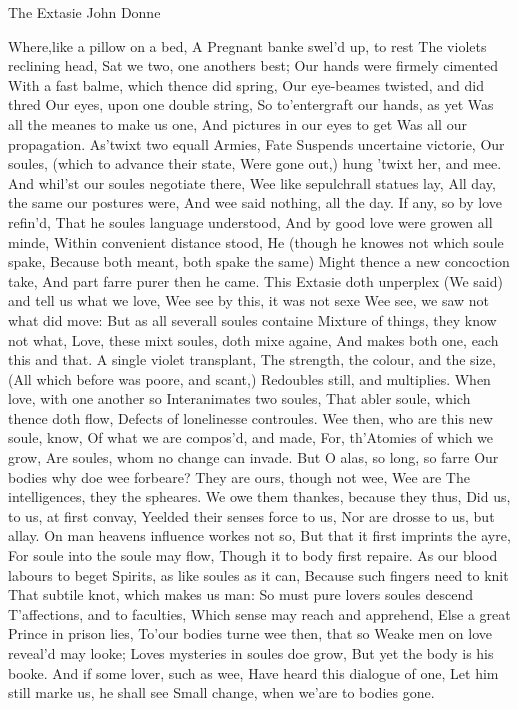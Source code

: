 \begin{poem}
{The Extasie}
{John Donne}
 
Where,like a pillow on a bed, 
   A Pregnant banke swel'd up, to rest 
The violets reclining head, 
   Sat we two, one anothers best; 
Our hands were firmely cimented 
With a fast balme, which thence did spring, 
Our eye-beames twisted, and did thred 
   Our eyes, upon one double string, 
So to'entergraft our hands, as yet 
   Was all the meanes to make us one, 
And pictures in our eyes to get 
   Was all our propagation. 
As'twixt two equall Armies, Fate 
   Suspends uncertaine victorie, 
Our soules, (which to advance their state, 
   Were gone out,) hung 'twixt her, and mee. 
And whil'st our soules negotiate there, 
   Wee like sepulchrall statues lay, 
All day, the same our postures were, 
   And wee said nothing, all the day. 
If any, so by love refin'd, 
   That he soules language understood, 
And by good love were growen all minde, 
   Within convenient distance stood, 
He (though he knowes not which soule spake, 
   Because both meant, both spake the same) 
Might thence a new concoction take, 
   And part farre purer then he came. 
This Extasie doth unperplex 
   (We said) and tell us what we love, 
Wee see by this, it was not sexe 
   Wee see, we saw not what did move: 
But as all severall soules containe 
   Mixture of things, they know not what, 
Love, these mixt soules, doth mixe againe, 
   And makes both one, each this and that. 
A single violet transplant, 
   The strength, the colour, and the size, 
(All which before was poore, and scant,) 
   Redoubles still, and multiplies. 
When love, with one another so 
   Interanimates two soules, 
That abler soule, which thence doth flow, 
   Defects of lonelinesse controules. 
Wee then, who are this new soule, know, 
   Of what we are compos'd, and made, 
For, th'Atomies of which we grow, 
   Are soules, whom no change can invade. 
But O alas, so long, so farre 
   Our bodies why doe wee forbeare? 
They are ours, though not wee, Wee are 
   The intelligences, they the spheares. 
We owe them thankes, because they thus, 
   Did us, to us, at first convay, 
Yeelded their senses force to us, 
   Nor are drosse to us, but allay. 
On man heavens influence workes not so, 
   But that it first imprints the ayre, 
For soule into the soule may flow, 
   Though it to body first repaire. 
As our blood labours to beget 
   Spirits, as like soules as it can, 
Because such fingers need to knit 
   That subtile knot, which makes us man: 
So must pure lovers soules descend 
   T'affections, and to faculties, 
Which sense may reach and apprehend, 
   Else a great Prince in prison lies, 
To'our bodies turne wee then, that so 
   Weake men on love reveal'd may looke; 
Loves mysteries in soules doe grow, 
   But yet the body is his booke. 
And if some lover, such as wee, 
   Have heard this dialogue of one, 
Let him still marke us, he shall see 
   Small change, when we'are to bodies gone.\\
\end{poem}

